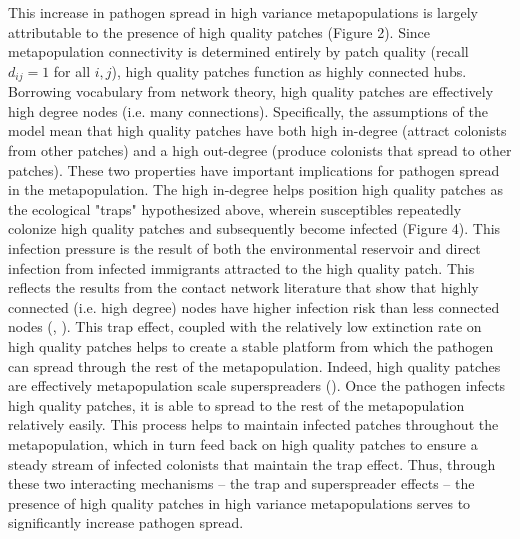 \documentclass{svjour3}
\begin{document}
This increase in pathogen spread in high variance metapopulations is largely attributable to the presence of high quality patches (Figure 2).  Since metapopulation connectivity is determined entirely by patch quality (recall $d_{ij}=1$ for all $i, j$), high quality patches function as highly connected hubs.  Borrowing vocabulary from network theory, high quality patches are effectively high degree nodes (i.e. many connections).  Specifically, the assumptions of the model mean that high quality patches have both high in-degree (attract colonists from other patches) and a high out-degree (produce colonists that spread to other patches).  These two properties have important implications for pathogen spread in the metapopulation. The high in-degree helps position high quality patches as the ecological "traps" hypothesized above, wherein susceptibles repeatedly colonize high quality patches and subsequently become infected (Figure 4).  This infection pressure is the result of both the environmental reservoir and direct infection from infected immigrants attracted to the high quality patch.  This reflects the results from the contact network literature that show that highly connected (i.e. high degree) nodes have higher infection risk than less connected nodes (\cite{Christley2005}, \cite{Keeling2005}).  This trap effect, coupled with the relatively low extinction rate on high quality patches helps to create a stable platform from which the pathogen can spread through the rest of the metapopulation.  Indeed, high quality patches are effectively metapopulation scale superspreaders (\cite{Lloyd-Smith2005}).  Once the pathogen infects high quality patches, it is able to spread to the rest of the metapopulation relatively easily.  This process helps to maintain infected patches throughout the metapopulation, which in turn feed back on high quality patches to ensure a steady stream of infected colonists that maintain the trap effect.  Thus, through these two interacting mechanisms -- the trap and superspreader effects -- the presence of high quality patches in high variance metapopulations serves to significantly increase pathogen spread.  
\end{document}
